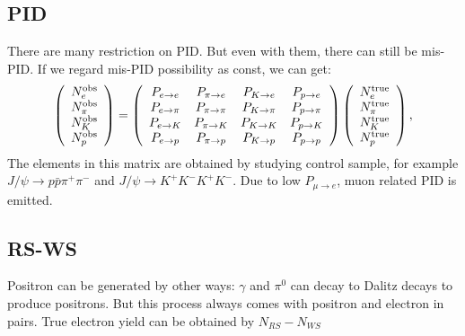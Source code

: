 \documentclass{beamer}
\begin{document}
\subsection{PID}
\begin{frame}
    There are many restriction on PID. But even with them, there can still be mis-PID. If we regard mis-PID possibility as const, we can get:
    \[
        \label{equation: PID-unfolding}
        \left(
        \begin{array}{cccc}
                N_{e}^{\rm obs}   \\
                N_{\pi}^{\rm obs} \\
                N_{K}^{\rm obs}   \\
                N_{p}^{\rm obs}
            \end{array}
        \right)
        =
        \left(
        \begin{array}{cccc}
                P_{e \rightarrow e}   & P_{\pi \rightarrow e}   & P_{K \rightarrow e}   & P_{p \rightarrow e}   \\
                P_{e \rightarrow \pi} & P_{\pi \rightarrow \pi} & P_{K \rightarrow \pi} & P_{p \rightarrow \pi} \\
                P_{e \rightarrow K}   & P_{\pi \rightarrow K}   & P_{K \rightarrow K}   & P_{p \rightarrow K}   \\
                P_{e \rightarrow p}   & P_{\pi \rightarrow p}   & P_{K \rightarrow p}   & P_{p \rightarrow p}
            \end{array}
        \right)
        \left(
        \begin{array}{cccc}
                N_{e}^{\rm true}   \\
                N_{\pi}^{\rm true} \\
                N_{K}^{\rm true}   \\
                N_{p}^{\rm true}
            \end{array}
        \right),
    \]
    The elements in this matrix are obtained by studying control sample, for example $J/\psi \rightarrow p\bar{p}\pi^+\pi^-$ and $J/\psi \rightarrow K^+K^-K^+K^-$.
    Due to low $P_{\mu \rightarrow e}$, muon related PID is emitted.
\end{frame}

\subsection{RS-WS}
\begin{frame}
    Positron can be generated by other ways: $\gamma$ and $\pi^0$ can decay to Dalitz decays to produce positrons. But this process always comes with positron and electron in pairs. True electron yield can be obtained by $N_{RS}-N_{WS}$
\end{frame}
\end{document}
